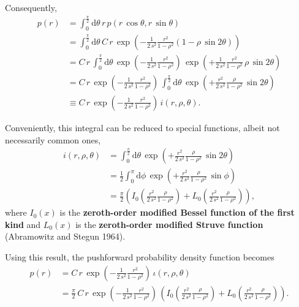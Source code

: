 \documentclass[
  letterpaper,
  DIV=11,
  numbers=noendperiod]{scrartcl}
\begin{document}
Consequently, \begin{align*}
p(r)
&=
\int_{0}^{\frac{\pi}{2}} \mathrm{d} \theta \, r \,
p( r \, \cos \theta, r \, \sin \theta )
\\
&=
\int_{0}^{\frac{\pi}{2}} \mathrm{d} \theta \,
C \, r \, \exp \left( - \frac{1}{2 \, s^{2}} \frac{r^{2}}{1 - \rho^{2}}
( 1 - \rho \, \sin 2 \theta)
\right)
\\
&=
C \, r \,
\int_{0}^{\frac{\pi}{2}} \mathrm{d} \theta \,
\exp \left( - \frac{1}{2 \, s^{2}} \frac{r^{2}}{1 - \rho^{2}}
\right) \,
\exp \left( + \frac{1}{2 \, s^{2}} \frac{r^{2}}{1 - \rho^{2}} \,
              \rho \, \sin 2 \theta
\right)
\\
&=
C \, r \,
\exp \left(
  - \frac{1}{2 \, s^{2}} \frac{r^{2}}{1 - \rho^{2}}
\right) \,
\int_{0}^{\frac{\pi}{2}} \mathrm{d} \theta \,
\exp \left(
  + \frac{r^{2}}{2 \, s^{2}} \frac{\rho}{1 - \rho^{2}} \,
    \sin 2 \theta
\right)
\\
&\equiv
C \, r \,
\exp \left(
  - \frac{1}{2 \, s^{2}} \frac{r^{2}}{1 - \rho^{2}}
\right) \,
i(r, \rho, \theta).
\end{align*}

Conveniently, this integral can be reduced to special functions, albeit
not necessarily common ones, \begin{align*}
i(r, \rho, \theta)
&=
\int_{0}^{\frac{\pi}{2}} \mathrm{d} \theta \,
\exp \left(
  + \frac{r^{2}}{2 \, s^{2}} \frac{\rho}{1 - \rho^{2}} \,
    \sin 2 \theta
\right)
\\
&=
\frac{1}{2} \int_{0}^{\pi} \mathrm{d} \phi \,
\exp \left(
  + \frac{r^{2}}{2 \, s^{2}} \frac{\rho}{1 - \rho^{2}} \,
    \sin \phi
\right)
\\
&=
\frac{\pi}{2} \left(
  I_{0} \left(
    \frac{r^{2}}{2 \, s^{2}} \frac{\rho}{1 - \rho^{2}}
  \right)
+ L_{0} \left(
    \frac{r^{2}}{2 \, s^{2}} \frac{\rho}{1 - \rho^{2}}
  \right)
\right),
\end{align*} where \(I_{0}(x)\) is the \textbf{zeroth-order modified
Bessel function of the first kind} and \(L_{0}(x)\) is the
\textbf{zeroth-order modified Struve function} (Abramowitz and Stegun
1964).

Using this result, the pushforward probability density function becomes
\begin{align*}
p(r)
&=
C \, r \,
\exp \left(
  - \frac{1}{2 \, s^{2}} \frac{r^{2}}{1 - \rho^{2}}
\right) \,
\iota(r, \rho, \theta)
\\
&=
\frac{\pi}{2} \, C \, r \,
\exp \left(
  - \frac{1}{2 \, s^{2}} \frac{r^{2}}{1 - \rho^{2}}
\right) \,
\left(
  I_{0} \left(
    \frac{r^{2}}{2 \, s^{2}} \frac{\rho}{1 - \rho^{2}}
  \right)
+ L_{0} \left(
    \frac{r^{2}}{2 \, s^{2}} \frac{\rho}{1 - \rho^{2}}
  \right)
\right).
\end{align*}
\end{document}

